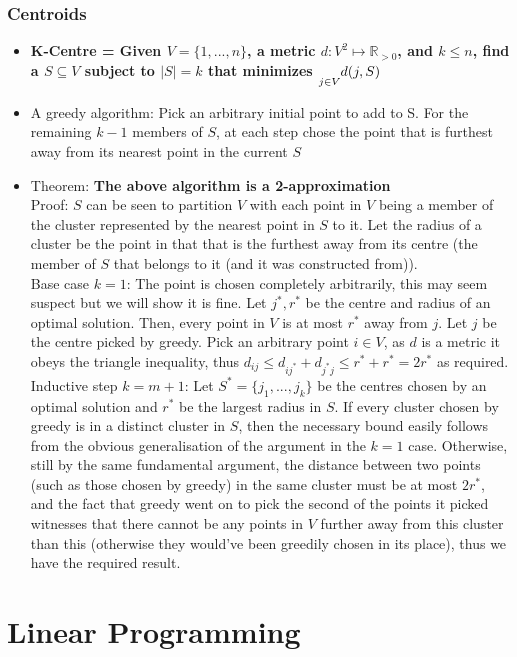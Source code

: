 \documentclass[20pt,a4paper,landscape]{extarticle}
\let\max\relax
\DeclareMathOperator*{\max}{max\:}
\begin{document}
\begin{flushleft}
\subsubsection{Centroids}
\begin{itemize}
\item \textbf{K-Centre = Given $V=\{1, ..., n\}$, a metric $d: V^2 \mapsto \mathbb{R}_{>0}$, and $k \leq n$, find a $S \subseteq V$ subject to $|S|=k$ that minimizes $\underset{j \in V}{\max}d(j, S)$}
\item A greedy algorithm: Pick an arbitrary initial point to add to S. For the remaining $k-1$ members of $S$, at each step chose the point that is furthest away from its nearest point in the current $S$
\item Theorem: \textbf{The above algorithm is a 2-approximation}\\
Proof: $S$ can be seen to partition $V$ with each point in $V$ being a member of the cluster represented by the nearest point in $S$ to it. Let the radius of a cluster be the point in that that is the furthest away from its centre (the member of $S$ that belongs to it (and it was constructed from)).\\
Base case $k=1$: The point is chosen completely arbitrarily, this may seem suspect but we will show it is fine. Let $j^\ast, r^\ast$ be the centre and radius of an optimal solution. Then, every point in $V$ is at most $r^\ast$ away from $j$. Let $j$ be the centre picked by greedy. Pick an arbitrary point $i \in V$, as $d$ is a metric it obeys the triangle inequality, thus $d_{ij} \leq d_{ij^\ast} + d_{j^\ast j} \leq r^\ast + r^\ast = 2r^\ast$ as required.\\
Inductive step $k=m+1$: Let $S^\ast = \{j_1, ..., j_k\}$ be the centres chosen by an optimal solution and $r^\ast$ be the largest radius in $S$. If every cluster chosen by greedy is in a distinct cluster in $S$, then the necessary bound easily follows from the obvious generalisation of the argument in the $k=1$ case. Otherwise, still by the same fundamental argument, the distance between two points (such as those chosen by greedy) in the same cluster must be at most $2r^\ast$, and the fact that greedy went on to pick the second of the points it picked witnesses that there cannot be any points in $V$ further away from this cluster than this (otherwise they would've been greedily chosen in its place), thus we have the required result.
\end{itemize}
\clearpage
\section{Linear Programming}

\end{flushleft}
\end{document}
